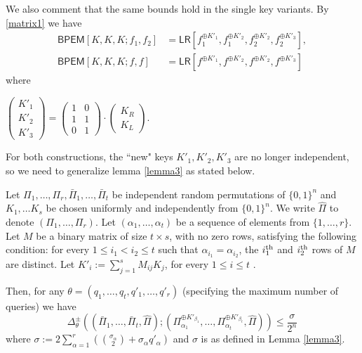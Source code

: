 \documentclass{llncs}
\newcommand{\s}{\{0,1\}}
\newcommand{\tx}{\textsf}
\begin{document}
We also comment that the same bounds hold in the single key variants. By \eqref{matrix1} we have
\begin{align*}
\tx{BPEM}[K,K,K;f_1,f_2]& = \tx{LR}[f_1^{\oplus K'_1}, f_1^{\oplus K'_2}, f_2^{\oplus K'_2}, f_2^{\oplus K'_3}],\\
\tx{BPEM}[K,K,K;f,f] &= \tx{LR}[f^{\oplus K'_1}, f^{\oplus K'_2}, f^{\oplus K'_2}, f^{\oplus K'_3}]
\end{align*}
where
\begin{center}
$\begin{pmatrix}
K'_{1} \\
K'_{2} \\
K'_{3}
\end{pmatrix}
= \begin{pmatrix}
1 & 0 \\
1 & 1 \\
0 & 1
\end{pmatrix}
\cdot
\begin{pmatrix}
K_{R} \\
K_{L}
\end{pmatrix}
$.
\end{center}

For both constructions, the ``new" keys $K'_{1},K'_{2},K'_{3}$ are no longer independent, so we need to generalize lemma \ref{lemma3} as stated below.

\begin{lemma}\label{lemma4}
Let $\Pi_1, \ldots, \Pi_r, \bar{\Pi}_1, \ldots, \bar{\Pi}_t$ be independent random permutations of $\s^n$ and $K_1, \ldots K_s$ be chosen uniformly and independently from $\s^n$.
We write $\hat{\Pi}$ to denote $(\Pi_1, \ldots, \Pi_r)$.
Let $(\alpha_1, \ldots, \alpha_t)$ be a sequence of elements from $\{1,\ldots,r\}$.
Let $M$ be a binary matrix of size $t \times s$, with no zero rows, satisfying the following condition: for every $1\leq i_1<i_2\leq t$ such that $\alpha_{i_1}=\alpha_{i_2}$, the $i_1^{\rm{th}}$ and $i_2^{\rm{th}}$ rows of $M$ are distinct.
Let $K'_i:=\sum_{j=1}^s M_{ij}K_j$, for every $1\leq i\leq t$ .

Then, for any $\theta = (q_1, \ldots, q_t, q'_1, \ldots, q'_r)$ (specifying the maximum number of queries) we have
\[\Delta^{\pm}_{\theta}\left((\bar{\Pi}_1, \ldots, \bar{\Pi}_t, \hat{\Pi});(\Pi_{\alpha_1}^{\oplus K'_{\beta_1}}, \ldots, \Pi_{\alpha_t}^{\oplus K'_{\beta_t}}, \hat{\Pi})\right) \leq  \frac{\sigma}{2^n}\] where
$\sigma :=2\sum_{\alpha=1}^r\left(\binom{\sigma_{\alpha}}{2}+\sigma_{\alpha}q'_{\alpha}\right)$
and $\sigma$ is as defined in Lemma \ref{lemma3}.
\end{lemma}
\end{document}
